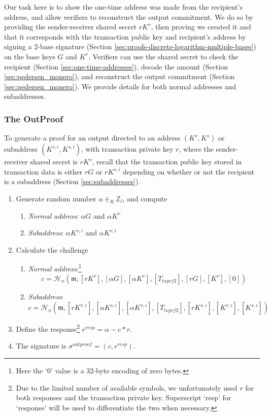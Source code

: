 Our task here is to show the one-time address was made from the recipient's address, and allow verifiers to reconstruct the output commitment. We do so by providing the sender-receiver shared secret $rK^v$, then proving we created it and that it corresponds with the transaction public key and recipient's address by signing a 2-base signature (Section \ref{sec:proofs-discrete-logarithm-multiple-bases}) on the base keys $G$ and $K^v$. Verifiers can use the shared secret to check the recipient (Section \ref{sec:one-time-addresses}), decode the amount (Section \ref{sec:pedersen_monero}), and reconstruct the output commitment (Section \ref{sec:pedersen_monero}). We provide details for both normal addresses and subaddresses.

\subsubsection*{The OutProof}

To generate a proof for an output directed to an address $(K^{v},K^{s})$ or subaddress $(K^{v,i},K^{s,i})$, with transaction private key $r$, where the sender-receiver shared secret is $rK^v$, recall that the transaction public key stored in transaction data is either $rG$ or $rK^{s,i}$ depending on whether or not the recipient is a subaddress (Section \ref{sec:subaddresses}).

\begin{enumerate}
	\item Generate random number $\alpha \in_R \mathbb{Z}_l$, and compute
	\begin{enumerate}
	    \item {\em Normal address}: $\alpha G$ and $\alpha K^v$
	    \item {\em Subaddress}: $\alpha K^{s,i}$ and $\alpha K^{v,i}$
	\end{enumerate}{}
	\item Calculate the challenge
	\begin{enumerate}
	    \item {\em Normal address}:\footnote{Here the `0' value is a 32-byte encoding of zero bytes.}
	    \[c = \mathcal{H}_n(\mathfrak{m},[rK^v], [\alpha G], [\alpha K^v], [T_{txprf2}], [rG], [K^v], [0])\]
	    \item {\em Subaddress}:
	    \[c = \mathcal{H}_n(\mathfrak{m},[rK^{v,i}], [\alpha K^{s,i}], [\alpha K^{v,i}], [T_{txprf2}], [rK^{s,i}], [K^{v,i}], [K^{s,i}])\]
	\end{enumerate}{}
	\item Define the response\footnote{Due to the limited number of available symbols, we unfortunately used $r$ for both responses and the transaction private key. Superscript `resp' for `response' will be used to differentiate the two when necessary.} $r^{resp} = \alpha - c*r$.
	\item The signature is $\sigma^{outproof} = (c, r^{resp})$.
\end{enumerate}{}

